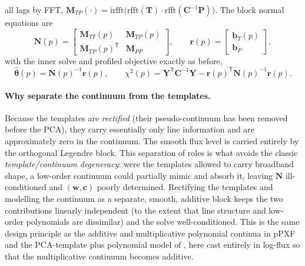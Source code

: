 \documentclass[11pt]{article}
\newcommand{\T}{\mathsf{T}}                    %
\newcommand{\rfft}{\mathrm{rfft}}
\newcommand{\irfft}{\mathrm{irfft}}
\begin{document}
all lags by FFT, $\mathbf{M}_{TP}(\cdot)=\irfft\big(\overline{\rfft(\mathbf{T})}\cdot\rfft(\mathbf{C}^{-1}\mathbf{P})\big)$.
The block normal equations are
\begin{equation}
  \mathbf{N}(p) =
  \begin{bmatrix}
    \mathbf{M}_{TT}(p) & \mathbf{M}_{TP}(p)\\[2pt]
    \mathbf{M}_{TP}(p)^\T & \mathbf{M}_{PP}
  \end{bmatrix},
  \qquad
  \mathbf{r}(p) =
  \begin{bmatrix}
    \mathbf{b}_T(p)\\[2pt]
    \mathbf{b}_P
  \end{bmatrix},
  \label{eq:blockN}
\end{equation}
with the inner solve and profiled objective exactly as before,
\begin{equation}
  \widehat{\boldsymbol\theta}(p) = \mathbf{N}(p)^{-1}\mathbf{r}(p),
  \qquad
  \chi^2(p) = \mathbf{Y}^\T\mathbf{C}^{-1}\mathbf{Y} - \mathbf{r}(p)^\T\mathbf{N}(p)^{-1}\mathbf{r}(p).
  \label{eq:profiledp2}
\end{equation}

\paragraph{Why separate the continuum from the templates.}
Because the templates are \emph{rectified} (their pseudo-continuum has been
removed before the PCA), they carry essentially only line information and are
approximately zero in the continuum. The smooth flux level is carried entirely by
the orthogonal Legendre block. This separation of roles is what avoids the
classic \emph{template/continuum degeneracy}: were the templates allowed to carry
broadband shape, a low-order continuum could partially mimic and absorb it,
leaving $\mathbf{N}$ ill-conditioned and $(\mathbf{w},\mathbf{c})$ poorly
determined. Rectifying the templates and modelling the continuum as a separate,
smooth, additive block keeps the two contributions linearly independent (to the
extent that line structure and low-order polynomials are dissimilar) and the solve
well-conditioned. This is the same design principle as the additive and
multiplicative polynomial continua in pPXF \citep*{Cappellari2017} and the
PCA-template plus polynomial model of \citet*{Bolton2012}, here cast entirely in
log-flux so that the multiplicative continuum becomes additive.

\end{document}

